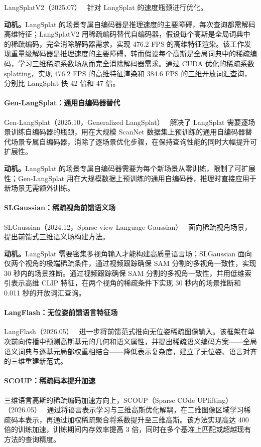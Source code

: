 LangSplatV2（2025.07）~\cite{2507_07136} 针对 LangSplat 的速度瓶颈进行优化。

\textbf{动机。}LangSplat 的场景专属自编码器是推理速度的主要障碍，每次查询都需解码高维特征；LangSplatV2 用稀疏编码替代自编码器，假设每个高斯是全局词典中的稀疏编码，完全消除解码器需求，实现 476.2 FPS 的高维特征渲染。该工作发现重量级解码器是推理速度的主要障碍，转而假设每个高斯是全局词典中的稀疏编码，学习三维稀疏系数场从而完全消除解码器需求。通过 CUDA 优化的稀疏系数 splatting，实现 476.2 FPS 的高维特征渲染和 384.6 FPS 的三维开放词汇查询，分别比 LangSplat 快 42 倍和 47 倍。

\paragraph{Gen-LangSplat：通用自编码器替代} Gen-LangSplat（2025.10，Generalized LangSplat）~\cite{2510_22930} 解决了 LangSplat 需要逐场景训练自编码器的瓶颈，用在大规模 ScanNet 数据集上预训练的通用自编码器替代场景专属自编码器，消除了逐场景优化步骤，在保持查询性能的同时大幅提升可扩展性。

\textbf{动机。}LangSplat 的场景专属自编码器需要为每个新场景从零训练，限制了可扩展性；Gen-LangSplat 用在大规模数据上预训练的通用自编码器，推理时直接应用于新场景无需额外训练。

\paragraph{SLGaussian：稀疏视角前馈语义场} SLGaussian（2024.12，Sparse-view Language Gaussian）~\cite{2412_08331} 面向稀疏视角场景，提出前馈式三维语义场构建方法。

\textbf{动机。}LangSplat 需要密集多视角输入才能构建高质量语言场；SLGaussian 面向仅两个视角的极端稀疏条件，通过视频跟踪确保 SAM 分割的多视角一致性，实现 30 秒内的场景推断。通过视频跟踪确保 SAM 分割的多视角一致性，并用低维索引表示高维 CLIP 特征，在两个视角的稀疏条件下实现 30 秒内的场景推断和 0.011 秒的开放词汇查询。

\paragraph{LangFlash：无位姿前馈语言特征场} LangFlash（2026.05）~\cite{2605_23287} 进一步将前馈范式推向无位姿稀疏图像输入。该框架在单次前向传播中预测高斯基元的几何和语义属性，并提出稀疏语义编码方案——全局语义词典与逐基元局部权重相结合——降低表示复杂度，建立了无位姿、语言对齐的三维重建新范式。

\paragraph{SCOUP：稀疏码本提升加速} 三维语言高斯的稀疏编码加速方向上，SCOUP（Sparse COde UPlifting）（2026.05）~\cite{2605_13600} 通过将语言表示学习与三维高斯优化解耦，在二维图像区域学习稀疏码本表示，再通过加权稀疏聚合将系数提升至三维高斯。该方法实现高达 400 倍的训练加速，训练期间内存效率提高 3 倍，同时在多个基准上匹配或超越现有方法的查询精度。

